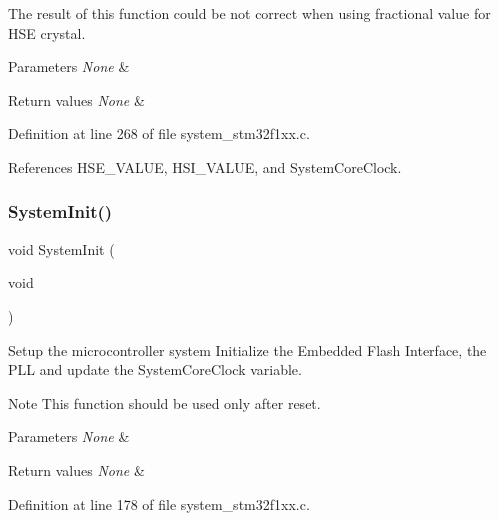 \begin{DoxyItemize}
\item The result of this function could be not correct when using fractional value for H\+SE crystal. 
\begin{DoxyParams}{Parameters}
{\em None} & \\
\hline
\end{DoxyParams}

\begin{DoxyRetVals}{Return values}
{\em None} & \\
\hline
\end{DoxyRetVals}

\end{DoxyItemize}

Definition at line 268 of file system\+\_\+stm32f1xx.\+c.



References H\+S\+E\+\_\+\+V\+A\+L\+UE, H\+S\+I\+\_\+\+V\+A\+L\+UE, and System\+Core\+Clock.

\mbox{\label{group__STM32F1xx__System__Private__Functions_ga93f514700ccf00d08dbdcff7f1224eb2}} 
\subsubsection{\texorpdfstring{System\+Init()}{SystemInit()}}
{\footnotesize\ttfamily void System\+Init (\begin{DoxyParamCaption}\item[{void}]{ }\end{DoxyParamCaption})}



Setup the microcontroller system Initialize the Embedded Flash Interface, the P\+LL and update the System\+Core\+Clock variable. 

\begin{DoxyNote}{Note}
This function should be used only after reset. 
\end{DoxyNote}

\begin{DoxyParams}{Parameters}
{\em None} & \\
\hline
\end{DoxyParams}

\begin{DoxyRetVals}{Return values}
{\em None} & \\
\hline
\end{DoxyRetVals}


Definition at line 178 of file system\+\_\+stm32f1xx.\+c.

